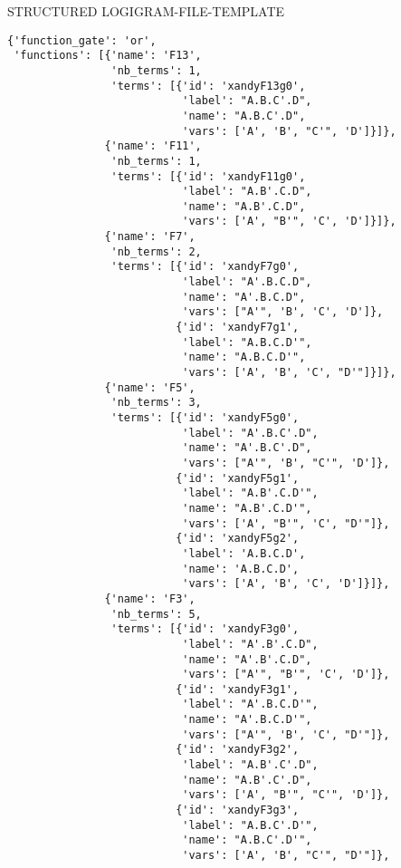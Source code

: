 STRUCTURED LOGIGRAM-FILE-TEMPLATE
\begin{verbatim}
{'function_gate': 'or',
 'functions': [{'name': 'F13',
                'nb_terms': 1,
                'terms': [{'id': 'xandyF13g0',
                           'label': "A.B.C'.D",
                           'name': "A.B.C'.D",
                           'vars': ['A', 'B', "C'", 'D']}]},
               {'name': 'F11',
                'nb_terms': 1,
                'terms': [{'id': 'xandyF11g0',
                           'label': "A.B'.C.D",
                           'name': "A.B'.C.D",
                           'vars': ['A', "B'", 'C', 'D']}]},
               {'name': 'F7',
                'nb_terms': 2,
                'terms': [{'id': 'xandyF7g0',
                           'label': "A'.B.C.D",
                           'name': "A'.B.C.D",
                           'vars': ["A'", 'B', 'C', 'D']},
                          {'id': 'xandyF7g1',
                           'label': "A.B.C.D'",
                           'name': "A.B.C.D'",
                           'vars': ['A', 'B', 'C', "D'"]}]},
               {'name': 'F5',
                'nb_terms': 3,
                'terms': [{'id': 'xandyF5g0',
                           'label': "A'.B.C'.D",
                           'name': "A'.B.C'.D",
                           'vars': ["A'", 'B', "C'", 'D']},
                          {'id': 'xandyF5g1',
                           'label': "A.B'.C.D'",
                           'name': "A.B'.C.D'",
                           'vars': ['A', "B'", 'C', "D'"]},
                          {'id': 'xandyF5g2',
                           'label': 'A.B.C.D',
                           'name': 'A.B.C.D',
                           'vars': ['A', 'B', 'C', 'D']}]},
               {'name': 'F3',
                'nb_terms': 5,
                'terms': [{'id': 'xandyF3g0',
                           'label': "A'.B'.C.D",
                           'name': "A'.B'.C.D",
                           'vars': ["A'", "B'", 'C', 'D']},
                          {'id': 'xandyF3g1',
                           'label': "A'.B.C.D'",
                           'name': "A'.B.C.D'",
                           'vars': ["A'", 'B', 'C', "D'"]},
                          {'id': 'xandyF3g2',
                           'label': "A.B'.C'.D",
                           'name': "A.B'.C'.D",
                           'vars': ['A', "B'", "C'", 'D']},
                          {'id': 'xandyF3g3',
                           'label': "A.B.C'.D'",
                           'name': "A.B.C'.D'",
                           'vars': ['A', 'B', "C'", "D'"]},

\end{verbatim}
